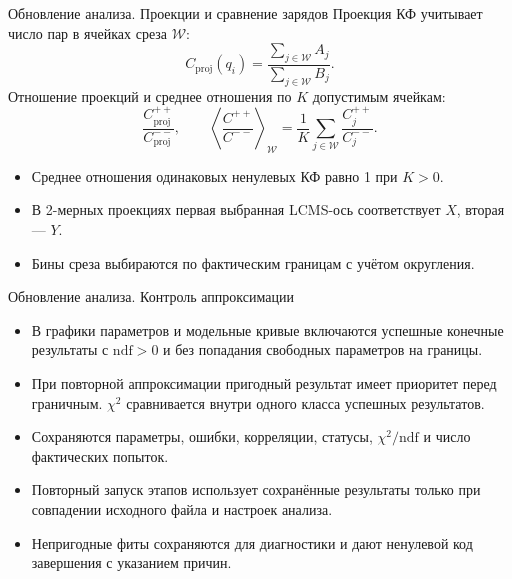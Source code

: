 \begin{frame}{Обновление анализа. Проекции и сравнение зарядов}
    \small
    Проекция КФ учитывает число пар в ячейках среза $\mathcal{W}$:
    \[
        C_{\mathrm{proj}}(q_i) =
        \frac{\sum_{j\in\mathcal{W}} A_j}{\sum_{j\in\mathcal{W}} B_j}.
    \]
    Отношение проекций и среднее отношения по $K$ допустимым ячейкам:
    \[
        \frac{C^{++}_{\mathrm{proj}}}{C^{--}_{\mathrm{proj}}},
        \qquad
        \left\langle\frac{C^{++}}{C^{--}}\right\rangle_{\mathcal{W}}
        = \frac{1}{K}\sum_{j\in\mathcal{W}}\frac{C^{++}_j}{C^{--}_j}.
    \]
    \begin{itemize}
        \item Среднее отношения одинаковых ненулевых КФ равно 1 при $K>0$.
        \item В 2-мерных проекциях первая выбранная LCMS-ось соответствует $X$,
              вторая --- $Y$.
        \item Бины среза выбираются по фактическим границам с учётом округления.
    \end{itemize}
\end{frame}

\begin{frame}{Обновление анализа. Контроль аппроксимации}
    \small
    \begin{itemize}
        \item В графики параметров и модельные кривые включаются успешные
              конечные результаты с $\mathrm{ndf}>0$ и без попадания
              свободных параметров на границы.
        \item При повторной аппроксимации пригодный результат имеет приоритет
              перед граничным. $\chi^2$ сравнивается внутри одного класса
              успешных результатов.
        \item Сохраняются параметры, ошибки, корреляции, статусы,
              $\chi^2/\mathrm{ndf}$ и число фактических попыток.
        \item Повторный запуск этапов использует сохранённые результаты только
              при совпадении исходного файла и настроек анализа.
        \item Непригодные фиты сохраняются для диагностики и дают ненулевой
              код завершения с указанием причин.
    \end{itemize}
\end{frame}

